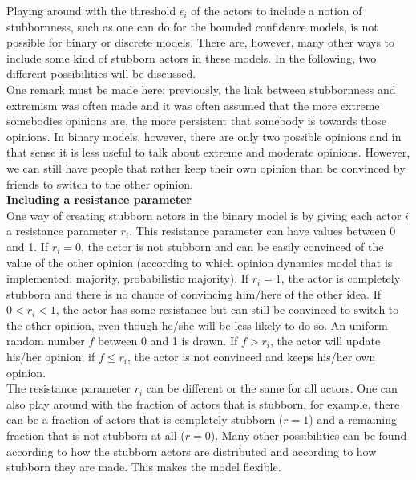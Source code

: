 \documentclass[11 pt , letterpaper , twoside , openright]{book}
\begin{document}
Playing around with the threshold $\epsilon_i$ of the actors to include a notion of stubbornness, such as one can do for the bounded confidence models, is not possible for binary or discrete models. There are, however, many other ways to include some kind of stubborn actors in these models. In the following, two different possibilities will be discussed. \\
\newline
One remark must be made here: previously, the link between stubbornness and extremism was often made and it was often assumed that the more extreme somebodies opinions are, the more persistent that somebody is towards those opinions. In binary models, however, there are only two possible opinions and in that sense it is less useful to talk about extreme and moderate opinions. However, we can still have people that rather keep their own opinion than be convinced by friends to switch to the other opinion.\\
\newline
\textbf{Including a resistance parameter}\\
\newline
One way of creating stubborn actors in the binary model is by giving each actor $i$ a resistance parameter $r_i$. This resistance parameter can have values between 0 and 1. If $r_i = 0$, the actor is not stubborn and can be easily convinced of the value of the other opinion (according to which opinion dynamics model that is implemented: majority, probabilistic majority). If $r_i = 1$, the actor is completely stubborn and there is no chance of convincing him/here of the other idea. If $0 < r_i < 1$, the actor has some resistance but can still be convinced to switch to the other opinion, even though he/she will be less likely to do so. An uniform random number $f$ between 0 and 1 is drawn. If $f > r_i$, the actor will update his/her opinion; if $f \leqslant r_i$, the actor is not convinced and keeps his/her own opinion.\\
\newline
The resistance parameter $r_i$ can be different or the same for all actors. One can also play around with the fraction of actors that is stubborn, for example, there can be a fraction of actors that is completely stubborn ($r = 1$) and a remaining fraction that is not stubborn at all ($r = 0$). Many other possibilities can be found according to how the stubborn actors are distributed and according to how stubborn they are made. This makes the model flexible.\\
\end{document}
